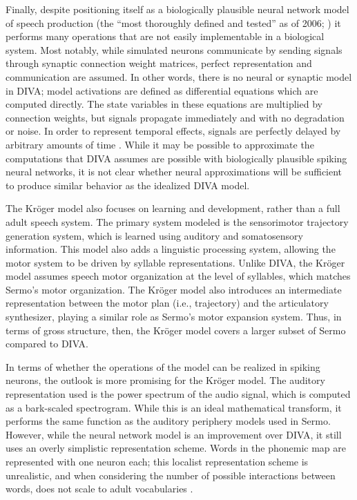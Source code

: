 Finally, despite positioning itself as
a biologically plausible neural network model
of speech production
(the ``most thoroughly defined and tested''
as of 2006; \citealp{guenther2006a})
it performs many operations
that are not easily implementable
in a biological system.
Most notably,
while simulated neurons communicate
by sending signals through
synaptic connection weight matrices,
perfect representation and communication
are assumed.
In other words, there is no neural
or synaptic model in DIVA;
model activations are defined as
differential equations
which are computed directly.
The state variables in these equations
are multiplied by connection weights,
but signals propagate immediately
and with no degradation or noise.
In order to represent temporal effects,
signals are perfectly delayed
by arbitrary amounts of time
\citep{nieto-castanon2011}.
While it may be possible to approximate
the computations that
DIVA assumes are possible
with biologically plausible spiking neural networks,
it is not clear whether
neural approximations will
be sufficient to produce similar behavior
as the idealized DIVA model.

The Kr\"{o}ger model also
focuses on learning and development,
rather than a full adult speech system.
The primary system modeled
is the sensorimotor trajectory generation system,
which is learned using
auditory and somatosensory information.
This model also adds
a linguistic processing system,
allowing the motor system to be driven
by syllable representations.
Unlike DIVA, the Kr\"{o}ger model
assumes speech motor organization
at the level of syllables,
which matches Sermo's motor organization.
The Kr\"{o}ger model also
introduces an intermediate representation
between the motor plan (i.e., trajectory)
and the articulatory synthesizer,
playing a similar role as Sermo's
motor expansion system.
Thus, in terms of gross structure, then,
the Kr\"{o}ger model covers a larger subset
of Sermo compared to DIVA.


In terms of whether the operations
of the model can be realized in spiking neurons,
the outlook is more promising
for the Kr\"{o}ger model.
The auditory representation used
is the power spectrum of the audio signal,
which is computed as a bark-scaled spectrogram.
While this is an ideal mathematical transform,
it performs the same function as the
auditory periphery models used in Sermo.
However, while the neural network model
is an improvement over DIVA,
it still uses an overly simplistic
representation scheme.
Words in the phonemic map
are represented with one neuron each;
this localist representation scheme is unrealistic,
and when considering the number of possible
interactions between words,
does not scale to adult vocabularies
\citep{crawford2014}.

